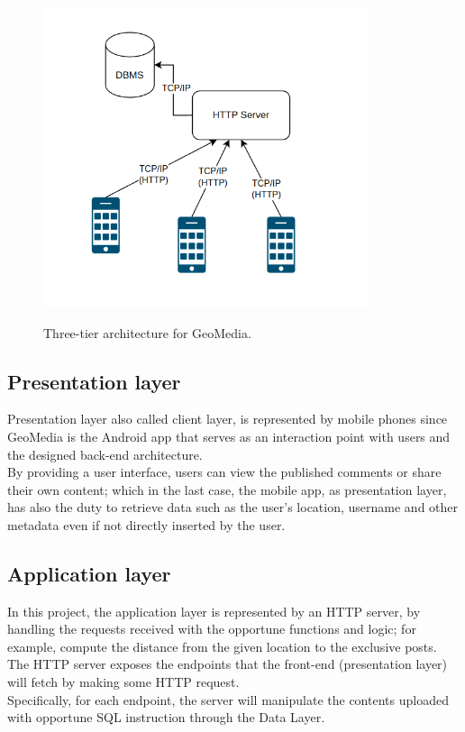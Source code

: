 \documentclass[conference]{IEEEtran}
\begin{document}
\begin{figure}[htbp]
{\includegraphics[width=9.5cm]{imgs/Architecture.png}}
\caption{Three-tier architecture for GeoMedia.}
\label{fig}
\end{figure}


\subsection{Presentation layer}
Presentation layer also called client layer, is represented by mobile phones since GeoMedia is the Android app that serves as an interaction point with users and the designed back-end architecture.
\\
By providing a user interface, users can view the published comments or share their own content; which in the last case, the mobile app, as presentation layer, has also the duty to retrieve data such as the user's location, username and other metadata even if not directly inserted by the user.
\subsection{Application layer}

In this project, the application layer is represented by an HTTP server, by handling the requests received with the opportune functions and logic; for example, compute the distance from the given location to the exclusive posts.
The HTTP server exposes the endpoints that the front-end (presentation layer) will fetch by making some HTTP request.
\\
Specifically, for each endpoint, the server will manipulate the contents uploaded with opportune SQL instruction through the Data Layer.
\end{document}
